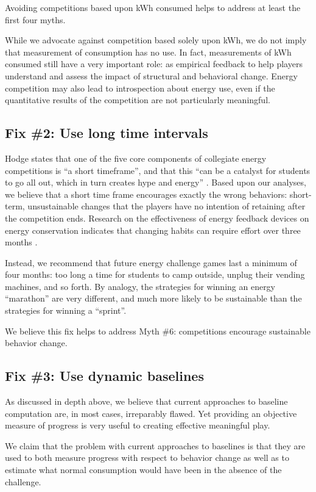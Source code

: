 \documentclass[jou]{apa} %
\begin{document}
Avoiding competitions based upon kWh consumed helps to address at least the first four myths.

While we advocate against competition based solely upon kWh, we do not imply that measurement
of consumption has no use. In fact, measurements of kWh consumed still have a very important role:
as empirical feedback to help players understand and assess the impact of structural and
behavioral change. Energy competition may also lead to introspection about energy use, even
 if the quantitative results of the competition are not particularly meaningful.

\subsection{Fix \#2: Use long time intervals}

Hodge states that one of the five core components of collegiate energy competitions is
``a short timeframe'', and that this ``can be a catalyst for students to go all out, which
in turn creates hype and energy'' \cite{Hodge2010}. Based upon our analyses, we believe
that a short time frame encourages exactly the wrong behaviors:  short-term, unsustainable
changes that the players have no intention of retaining after the competition ends.
Research on the effectiveness of energy feedback devices on energy conservation indicates
that changing habits can require effort over three months \cite{darby-review-2006}.

Instead, we recommend that future energy challenge games last a minimum of four months:
too long a time for students to camp outside, unplug their vending machines, and so forth.
By analogy, the strategies for winning an energy ``marathon'' are very different, and much
more likely to be sustainable than the strategies for winning a ``sprint''.

We believe this fix helps to address Myth \#6: competitions encourage sustainable
behavior change.

\subsection{Fix \#3: Use dynamic baselines}

As discussed in depth above, we believe that current approaches to baseline computation
are, in most cases, irreparably flawed.  Yet providing an objective measure of progress is
very useful to creating effective meaningful play.  

We claim that the problem with current approaches to baselines is that they are used to
both measure progress with respect to behavior change as well as to estimate what
normal consumption would have been in the absence of the challenge.
\end{document}

